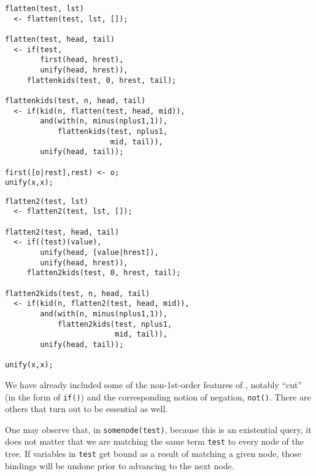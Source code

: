 
\label{crewfig5}

\begin{verbatim}
flatten(test, lst)
  <- flatten(test, lst, []);

flatten(test, head, tail)
  <- if(test,
        first(head, hrest),
        unify(head, hrest)),
     flattenkids(test, 0, hrest, tail);

flattenkids(test, n, head, tail)
  <- if(kid(n, flatten(test, head, mid)),
        and(with(n, minus(nplus1,1)),
            flattenkids(test, nplus1,
                        mid, tail)),
        unify(head, tail));

first([o|rest],rest) <- o;
unify(x,x);
\end{verbatim}

\label{crewfig6}

\begin{verbatim}
flatten2(test, lst)
  <- flatten2(test, lst, []);

flatten2(test, head, tail)
  <- if((test)(value),
        unify(head, [value|hrest]),
        unify(head, hrest)),
     flatten2kids(test, 0, hrest, tail);

flatten2kids(test, n, head, tail)
  <- if(kid(n, flatten2(test, head, mid)),
        and(with(n, minus(nplus1,1)),
            flatten2kids(test, nplus1,
                         mid, tail)),
        unify(head, tail));

unify(x,x);
\end{verbatim}

\secup %

\secdown %

We have already included some of the non-1st-order features of \prolog, notably
``cut'' (in the form of \verb|if()|) and the corresponding notion of negation,
\verb|not()|. There are others that turn out to be essential as well.

\label{crew31}

One may observe that, in \verb|somenode(test)|, because this is an existential
query, it does not matter that we are matching the same term \verb|test| to
every node of the tree. If variables in \verb|test| get bound as a result of
matching a given node, those bindings will be undone prior to advancing to the
next node.

